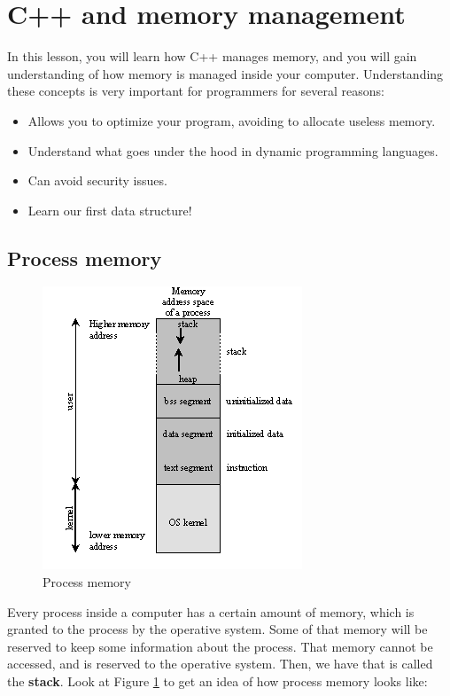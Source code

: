 \documentclass[../notebook.tex]{subfiles}
\begin{document}
\begin{center}

\end{center}

\section{ C++ and memory management }
In this lesson, you will learn how C++ manages memory, and you will gain understanding of how memory is managed inside your computer. Understanding these concepts is very important for programmers for several reasons:
\begin{itemize}
  \item Allows you to optimize your program, avoiding to allocate useless memory.
  \item Understand what goes under the hood in dynamic programming languages.
  \item Can avoid security issues.
  \item Learn our first data structure!
\end{itemize}
\subsection{ Process memory } %
\label{sub:subsection name}
\begin{figure}
  \centering
  \includegraphics[scale=.88]{mstack.png}
  \caption{ Process memory }
  \label{fig:mstack}
\end{figure}
Every process inside a computer has a certain amount of memory, which is granted to the process by the operative system. Some of that memory will be reserved to keep some information about the process. That memory cannot be accessed, and is reserved to the operative system.  Then, we have that is called the {\bf stack}. Look at Figure \ref{fig:mstack} to get an idea of how process memory looks like:\\
\end{document}

